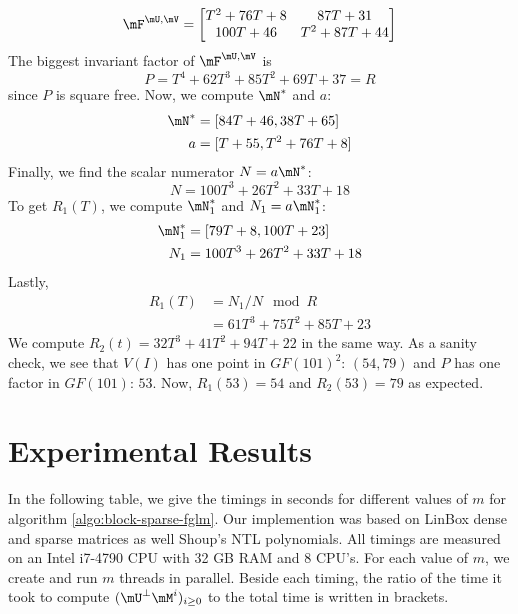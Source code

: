 \documentclass[12pt]{article}
\begin{document}
$$ \mF^{\mU,\mV} =
\begin{bmatrix}
T^2 + 76T + 8&       87T + 31\\
    100T + 46& T^2 + 87T + 44
\end{bmatrix}
$$
The biggest invariant factor of $\mF^{\mU,\mV}$ is 
$$P = T^4 + 62T^3 + 85T^2 + 69T + 37 = R$$
since $P$ is square free. 
Now, we compute $\mN^*$ and $a$:
\begin{align*}
\mN^* &=[84T + 46, 38T + 65]\\
a &= [T + 55, T^2 + 76T + 8]
\end{align*}
Finally, we find the scalar numerator $N = a\mN^*$:
$$ N = 100T^3 + 26T^2 + 33T + 18$$
To get $R_1(T)$, we compute $\mN_1^*$ and $N_1=a\mN_1^*$:
\begin{align*}
\mN_1^* &= [79T + 8, 100T + 23]\\
N_1 &= 100T^3 + 26T^2 + 33T + 18
\end{align*}
Lastly,
\begin{align*}
R_1(T) &= N_1 / N \mod R \\
       &= 61T^3 + 75T^2 + 85T + 23
\end{align*}
We compute $R_2(t)= 32T^3 + 41T^2 + 94T + 22$ in the same way. 
As a sanity check,
we see that $V(I)$ has one point in $GF(101)^2$:
$(54,79)$ and $P$ has one factor in $GF(101)$: $53$. Now,
$R_1(53) = 54$ and $R_2(53) = 79$ as expected.

\newpage
\section{Experimental Results}\label{section:ex}
In the following table, we give the timings in seconds for different values 
of $m$ for algorithm \ref{algo:block-sparse-fglm}. 
Our implemention was based on LinBox \cite{LinBox} dense and 
sparse matrices as well Shoup's NTL \cite{NTL} polynomials. All timings
are measured on an Intel i7-4790 CPU with 32 GB RAM and 8 CPU's. For each
value of $m$, we create and run $m$ threads in parallel. Beside each timing,
the ratio of the time it took to compute $(\mU^{\perp} \mM^i)_{i\ge0}$ to
the total time is written in brackets.
\end{document}
